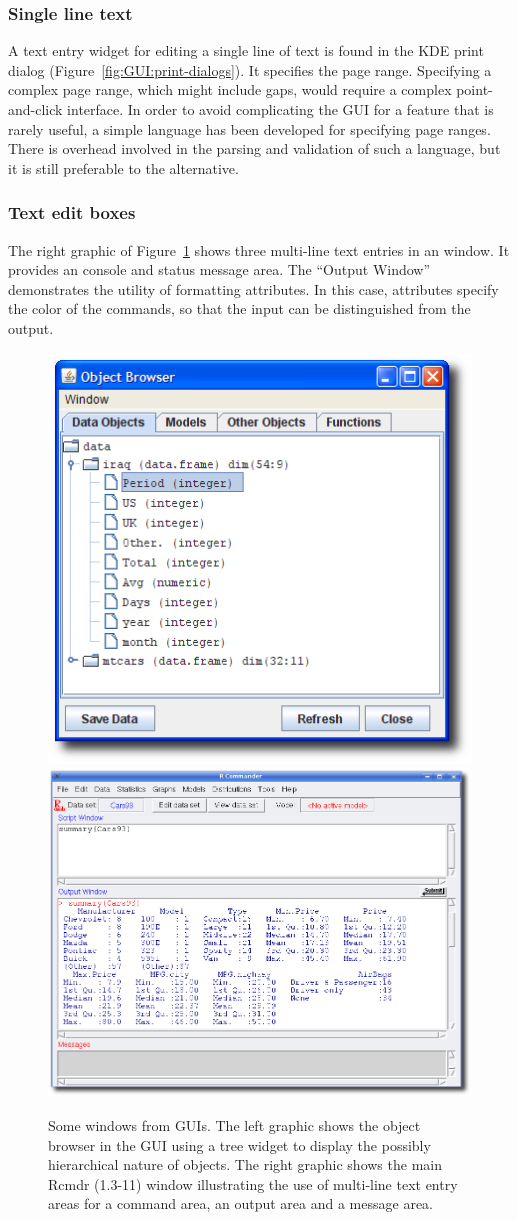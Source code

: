 \subsubsection{Single line text}
\label{sec:GUI:single-line-text}

A text entry widget for editing a single line of text is found in the
KDE print dialog (Figure~\ref{fig:GUI:print-dialogs}). It specifies
the page range. Specifying a complex page range, which might include
gaps, would require a complex point-and-click interface. In
order to avoid complicating the GUI for a feature that is rarely
useful, a simple language has been developed for specifying page
ranges. There is overhead involved in the parsing and validation of
such a language, but it is still preferable to the alternative.

\subsubsection{Text edit boxes}
\label{sec:GUI:textboxes}

The right graphic
of Figure~\ref{fig:GUI:R-guis-exs-JGR-Rcmdr} shows three multi-line text entries
in an  window. It provides an \R\/ console and status message area. The
``Output Window'' demonstrates the utility of formatting
attributes. In this case, attributes specify the color of
the commands, so that the input can be distinguished from the output.

\begin{figure}
  \centering
  \includegraphics[width=.35\textwidth]{JGR-object-browser}
  \includegraphics[width=.5\textwidth]{Rcmdr-main-window}
  \caption{
    Some windows from \R\/ GUIs.
    The left graphic shows the object browser in the  GUI
    using a tree widget 
    to display the possibly hierarchical nature of \R\/ objects.
    The right graphic shows the main Rcmdr (1.3-11) window
    illustrating the use of multi-line text entry areas for a command
    area, an output area and a message area.}
  \label{fig:GUI:R-guis-exs-JGR-Rcmdr}
\end{figure}


